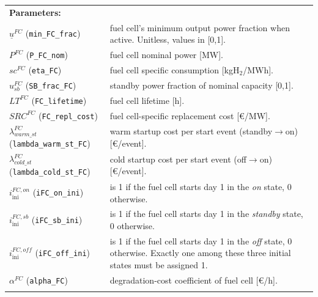 \documentclass{article}
\begin{document}
\noindent
\begin{tabularx}{\textwidth}{@{}l X@{}}
    \textbf{Parameters:} \\
    $\underline{u}^{FC}$ (\verb|min_FC_frac|)
      & fuel cell's minimum output power fraction when active.
        Unitless, values in [0,1]. \\
    $P^{FC}$ (\verb|P_FC_nom|)
      & fuel cell nominal power [MW]. \\
    $sc^{FC}$ (\verb|eta_FC|)
      & fuel cell specific consumption [kgH$_2$/MWh]. \\
    $u_{sb}^{FC}$ (\verb|SB_frac_FC|)
      & standby power fraction of nominal capacity [0,1]. \\
    $LT^{FC}$ (\verb|FC_lifetime|)
      & fuel cell lifetime [h]. \\
    $SRC^{FC}$ (\verb|FC_repl_cost|)
      & fuel cell-specific replacement cost [\euro{}/MW]. \\
    $\lambda^{FC}_{warm\_st}$ (\verb|lambda_warm_st_FC|)
      & warm startup cost per start event (standby$\rightarrow$on) [\euro{}/event]. \\
    $\lambda^{FC}_{cold\_st}$ (\verb|lambda_cold_st_FC|)
      & cold startup cost per start event (off$\rightarrow$on) [\euro{}/event]. \\
    $i^{FC,on}_{\mathrm{ini}}$ (\verb|iFC_on_ini|)
      & is 1 if the fuel cell starts day 1 in the \emph{on} state, 0 otherwise. \\
    $i^{FC,sb}_{\mathrm{ini}}$ (\verb|iFC_sb_ini|)
      & is 1 if the fuel cell starts day 1 in the \emph{standby} state, 0 otherwise. \\
    $i^{FC,off}_{\mathrm{ini}}$ (\verb|iFC_off_ini|)
      & is 1 if the fuel cell starts day 1 in the \emph{off} state, 0 otherwise.
        Exactly one among these three initial states must be assigned 1. \\
    $\alpha^{FC}$ (\verb|alpha_FC|)
      & degradation-cost coefficient of fuel cell [\euro{}/h]. \\
      \\
\end{tabularx}
\end{document}
